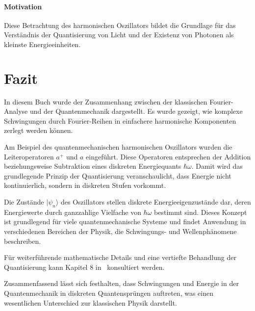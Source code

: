 		\paragraph{Motivation}
		Diese Betrachtung des harmonischen Oszillators bildet die Grundlage für das Verständnis der Quantisierung von Licht und der Existenz von Photonen als kleinste Energieeinheiten.

\section{Fazit\label{fourier:section:fazit}}
	In diesem Buch wurde der Zusammenhang zwischen der klassischen Fourier-Analyse und der Quantenmechanik dargestellt.
	Es wurde gezeigt, wie komplexe Schwingungen durch Fourier-Reihen in einfachere harmonische Komponenten zerlegt werden können.

	Am Beispiel des quantenmechanischen harmonischen Oszillators wurden die Leiteroperatoren $a^+$ und $a$ eingeführt.
	Diese Operatoren entsprechen der Addition beziehungsweise Subtraktion eines diskreten Energiequants $\hbar \omega$.
	Damit wird das grundlegende Prinzip der Quantisierung veranschaulicht, dass Energie nicht kontinuierlich, sondern in diskreten Stufen vorkommt.

	Die Zustände $|\psi_n\rangle$ des Oszillators stellen diskrete Energieeigenzustände dar, deren Energiewerte durch ganzzahlige Vielfache von $\hbar \omega$ bestimmt sind.
	Dieses Konzept ist grundlegend für viele quantenmechanische Systeme und findet Anwendung in verschiedenen Bereichen der Physik, die Schwingungs- und Wellenphänomene beschreiben.

	Für weiterführende mathematische Details und eine vertiefte Behandlung der Quantisierung kann Kapitel 8 in~\cite{fourier:quantenmechanik} konsultiert werden.

	Zusammenfassend lässt sich festhalten, dass Schwingungen und Energie in der Quantenmechanik in diskreten Quantensprüngen auftreten, was einen wesentlichen Unterschied zur klassischen Physik darstellt.
